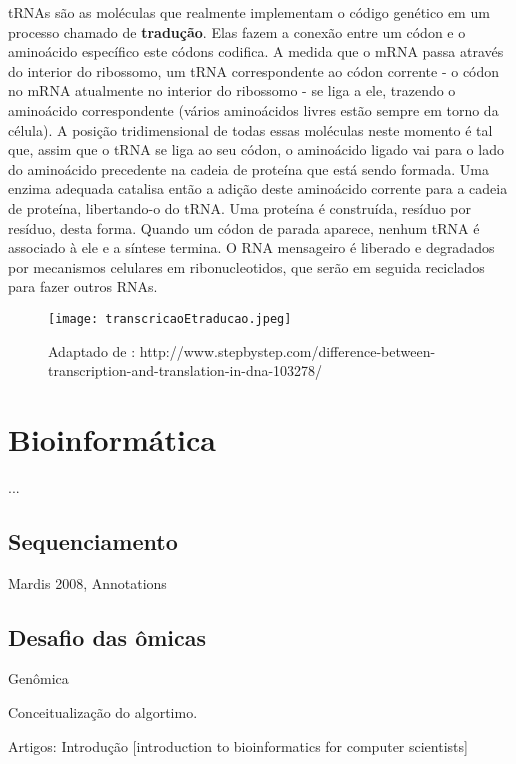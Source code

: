 \indent tRNAs são as moléculas que realmente implementam o código genético em um processo chamado de \textbf{tradução}. Elas fazem a conexão entre um códon e o aminoácido específico este códons codifica. A medida que o mRNA passa através do interior do ribossomo, um tRNA correspondente ao códon corrente - o códon no mRNA atualmente no interior do ribossomo - se liga a ele, trazendo o aminoácido correspondente (vários aminoácidos livres estão sempre em torno da célula). A posição tridimensional de todas essas moléculas neste momento é tal que, assim que o tRNA se liga ao seu códon, o aminoácido ligado vai para o lado do aminoácido precedente na cadeia de proteína que está sendo formada. Uma enzima adequada catalisa então a adição deste aminoácido corrente para a cadeia de proteína, libertando-o do tRNA. Uma proteína é construída, resíduo por resíduo, desta forma. Quando um códon de parada aparece, nenhum tRNA é associado à ele e a síntese termina. O RNA mensageiro é liberado e degradados por mecanismos celulares em ribonucleotidos, que serão em seguida reciclados para fazer outros RNAs. \\




\cite{setubal97}






\begin{figure}[h]
    \centering
    \texttt{[image: transcricaoEtraducao.jpeg]}
    \caption{Adaptado de : http://www.stepbystep.com/difference-between-transcription-and-translation-in-dna-103278/ }
    \label{fig:transcricaoEtraducao}
\end{figure}




\section{Bioinformática} \label{bioinformatica}
 \indent ...
\subsection{Sequenciamento} 

\indent Mardis 2008, Annotations


\subsection{Desafio das ômicas}

\indent 
Genômica

\indent Conceitualização do algortimo.

Artigos:
Introdução
[introduction to bioinformatics for computer scientists]

